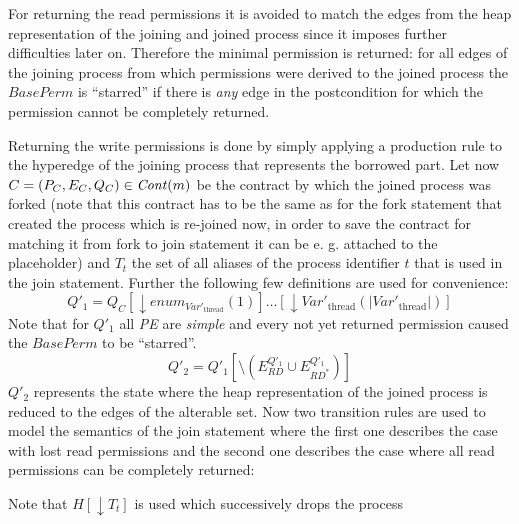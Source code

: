 	For returning the read permissions it is avoided to match the
	edges from the heap representation of the joining and
	joined process since it imposes further difficulties later on.
	Therefore the minimal permission is returned: for all
	edges of the joining process from which permissions were 
	derived to the joined process the $\mathit{BasePerm}$ is 
	\enquote{starred} if there is \emph{any} edge in the postcondition
	for which the permission cannot be completely returned.

	Returning the write permissions is done by simply applying a
	production rule to the hyperedge of the joining process that
	represents the borrowed part. Let now
	$C = (P_{C}, E_{C}, Q_{C})\in\Cont(m)$ be the contract by which
	the joined process was forked (note that this contract has to be the same
	as for the fork statement that created the process which is re-joined now,
	in order to save the contract for matching it from fork to join statement
	it can be e. g. attached to the placeholder) and $T_t$ the set of all
	aliases of the process identifier $t$ that is used in the join statement.
	Further the following few definitions are used for convenience:
	\begin{equation*}
		\label{eq:joinH}
		Q'_{1}=Q_{C}[\downarrow\mathit{enum}_{\mathit{Var}'_{\text{thread}}}(1)]
		\dots[\downarrow\mathit{Var}'_{\text{thread}}
		(|\mathit{Var}'_{\text{thread}}|)]
	\end{equation*}
	Note that for $Q'_{1}$ all \emph{\ac{PE}} are \emph{simple} and every not
	yet returned permission caused the $\mathit{BasePerm}$ to be
	\enquote{starred}.
	\begin{equation*}
		Q'_{2} = Q'_{1}[\setminus (E^{Q'_{1}}_{\mathit{RD}}\cup
			E^{Q'_{1}}_{\mathit{RD^{\ast}}})]
	\end{equation*}
	$Q'_{2}$ represents the state where the heap representation of the
	joined process is reduced to the edges of the alterable set.
	Now two transition rules are used to model the semantics of the join
	statement where the first one describes the case with lost read
	permissions and the second one describes the case where all
	read permissions can be completely returned:
	\begin{prooftree}
		\label{prooftree:join}
	\end{prooftree}
	Note that $H[\downarrow T_{t}]$ is used which successively drops the process
